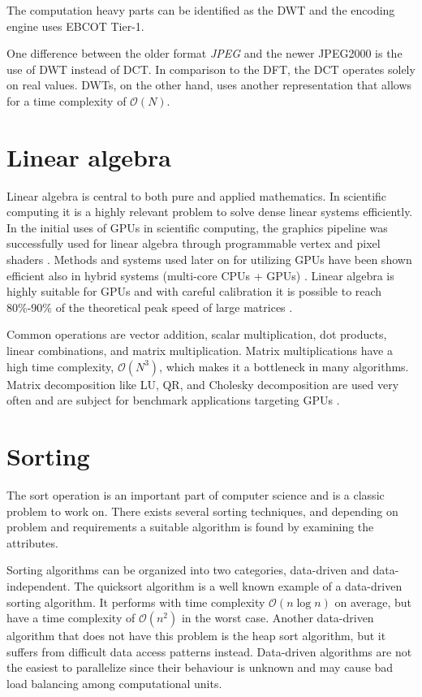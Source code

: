 The computation heavy parts can be identified as the \gls{DWT} and the encoding engine uses \gls{EBCOT} Tier-1.

One difference between the older format \emph{JPEG} and the newer JPEG2000 is the use of \gls{DWT} instead of \gls{DCT}. In comparison to the \gls{DFT}, the \gls{DCT} operates solely on real values. \gls{DWT}s, on the other hand, uses another representation that allows for a time complexity of $\mathcal{O}(N)$.

\section{Linear algebra}
Linear algebra is central to both pure and applied mathematics. In scientific computing it is a highly relevant problem to solve dense linear systems efficiently. In the initial uses of GPUs in scientific computing, the graphics pipeline was successfully used for linear algebra through programmable vertex and pixel shaders \cite{kruger2003linear}. Methods and systems used later on for utilizing \gls{GPU}s have been shown efficient also in hybrid systems (multi-core \gls{CPU}s + \gls{GPU}s) \cite{tomov2010dense}. Linear algebra is highly suitable for \gls{GPU}s and with careful calibration it is possible to reach 80\%-90\% of the theoretical peak speed of large matrices \cite{volkov2008benchmarking}.

Common operations are vector addition, scalar multiplication, dot products, linear combinations, and matrix multiplication. Matrix multiplications have a high time complexity, $\mathcal{O}(N^3)$, which makes it a bottleneck in many algorithms. Matrix decomposition like LU, QR, and Cholesky decomposition are used very often and are subject for benchmark applications targeting \gls{GPU}s \cite{volkov2008benchmarking}.

\section{Sorting}
The sort operation is an important part of computer science and is a classic problem to work on. There exists several sorting techniques, and depending on problem and requirements a suitable algorithm is found by examining the attributes.

Sorting algorithms can be organized into two categories, data-driven and data-independent. The quicksort algorithm is a well known example of a data-driven sorting algorithm. It performs with time complexity $\mathcal{O}(n\log{n})$ on average, but have a time complexity of $\mathcal{O}(n^2)$ in the worst case. Another data-driven algorithm that does not have this problem is the heap sort algorithm, but it suffers from difficult data access patterns instead. Data-driven algorithms are not the easiest to parallelize since their behaviour is unknown and may cause bad load balancing among computational units.

